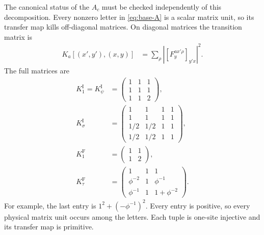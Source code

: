 The canonical status of the $A_c$ must be checked independently of
this decomposition. Every nonzero letter in \cref{eq:base-A} is a
scalar matrix unit, so its transfer map kills off-diagonal matrices.
On diagonal matrices the transition matrix is
\begin{align}
	K_a[(x',y'),(x,y)]
	 & =\sum_\rho\left|[F^{a x'\rho}_y]_{y'x}\right|^2.
\end{align}
The full matrices are
\begin{align}
	K_1^{\mathrm I}=K_\psi^{\mathrm I}
	 & =\begin{pmatrix}1&1&1\\1&1&1\\1&1&2\end{pmatrix}, \\
	K_\sigma^{\mathrm I}
	 & =\begin{pmatrix}
		    1   & 1   & 1 & 1 \\
		    1   & 1   & 1 & 1 \\
		    1/2 & 1/2 & 1 & 1 \\
		    1/2 & 1/2 & 1 & 1
	    \end{pmatrix},                               \\
	K_1^{\mathrm F}
	 & =\begin{pmatrix}1&1\\1&2\end{pmatrix},            \\
	K_\tau^{\mathrm F}
	 & =\begin{pmatrix}
		    1         & 1 & 1           \\
		    \phi^{-2} & 1 & \phi^{-1}   \\
		    \phi^{-1} & 1 & 1+\phi^{-2}
	    \end{pmatrix}.
	\label{eq:base-transfer}
\end{align}
For example, the last entry is $1^2+(-\phi^{-1})^2$.
Every entry is positive, so every physical matrix unit occurs among
the letters. Each tuple is one-site injective and its transfer map
is primitive.

